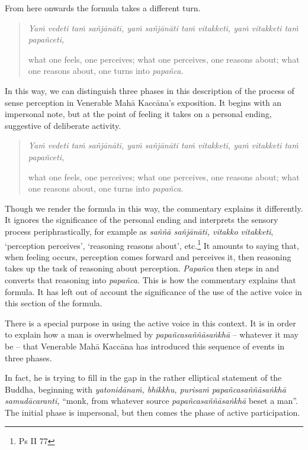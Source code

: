 From here onwards the formula takes a different turn.

\begin{quote}
\emph{Yaṁ vedeti taṁ sañjānāti, yaṁ sañjānāti taṁ vitakketi, yaṁ vitakketi taṁ papañceti,}

what one feels, one perceives; what one perceives, one reasons about; what one reasons about, one turns into \emph{papañca}.
\end{quote}

In this way, we can distinguish three phases in this description of the process of sense perception in Venerable Mahā Kaccāna's exposition. It begins with an impersonal note, but at the point of feeling it takes on a personal ending, suggestive of deliberate activity.

\begin{quote}
\emph{Yaṁ vedeti taṁ sañjānāti, yaṁ sañjānāti taṁ vitakketi, yaṁ vitakketi taṁ papañceti,}

what one feels, one perceives; what one perceives, one reasons about; what one reasons about, one turns into \emph{papañca}.
\end{quote}

Though we render the formula in this way, the commentary explains it differently. It ignores the significance of the personal ending and interprets the sensory process periphrastically, for example as \emph{saññā sañjānāti, vitakko vitakketi}, `perception perceives', `reasoning reasons about', etc.\footnote{Ps II 77} It amounts to saying that, when feeling occurs, perception comes forward and perceives it, then reasoning takes up the task of reasoning about perception. \emph{Papañca} then steps in and converts that reasoning into \emph{papañca}. This is how the commentary explains that formula. It has left out of account the significance of the use of the active voice in this section of the formula.

There is a special purpose in using the active voice in this context. It is in order to explain how a man is overwhelmed by \emph{papañcasaññāsaṅkhā} -- whatever it may be -- that Venerable Mahā Kaccāna has introduced this sequence of events in three phases.

In fact, he is trying to fill in the gap in the rather elliptical statement of the Buddha, beginning with \emph{yatonidānaṁ, bhikkhu, purisaṁ papañcasaññāsaṅkhā samudācaranti,} ``monk, from whatever source \emph{papañcasaññāsaṅkhā} beset a man''. The initial phase is impersonal, but then comes the phase of active participation.

